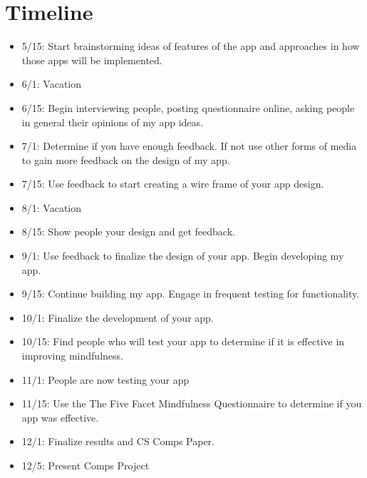 \documentclass[12pt,twocolumn]{article}
\begin{document}
\section{Timeline}
\begin{itemize}
  \item 5/15: Start brainstorming ideas of features of the app and approaches in how those apps will be implemented.
  \item 6/1: Vacation
  \item 6/15: Begin interviewing people, posting questionnaire online, asking people in general their opinions of my app ideas.
  \item 7/1: Determine if you have enough feedback. If not use other forms of media to gain more feedback on the design of my app. 
  \item 7/15: Use feedback to start creating a wire frame of your app design.
  \item 8/1: Vacation
  \item 8/15: Show people your design and get feedback. 
  \item 9/1: Use feedback to finalize the design of your app. Begin developing my app.
  \item 9/15: Continue building my app. Engage in frequent testing for functionality.
  \item 10/1: Finalize the development of your app.
  \item 10/15: Find people who will test your app to determine if it is effective in improving mindfulness.
  \item 11/1: People are now testing your app
  \item 11/15: Use the The Five Facet Mindfulness Questionnaire to determine if you app was effective.
  \item 12/1: Finalize results and CS Comps Paper.
  \item 12/5: Present Comps Project
  
\end{itemize}
\printbibliography 
\end{document}
